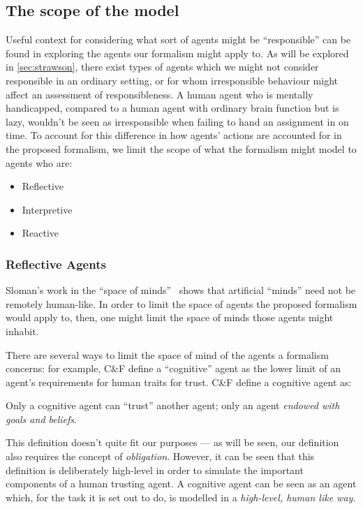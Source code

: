 \subsection{The scope of the model}\label{subsec:types-of-agents}
Useful context for considering what sort of agents might be ``responsible'' can be found in exploring the agents our formalism might apply to. As will be explored in \cref{sec:strawson}, there exist types of agents which we might not consider responsible in an ordinary setting, or for whom irresponsible behaviour might affect an assessment of responsibleness. A human agent who is mentally handicapped, compared to a human agent with ordinary brain function but is lazy, wouldn't be seen as irresponsible when failing to hand an assignment in on time. To account for this difference in how agents' actions are accounted for in the proposed formalism, we limit the scope of what the formalism might model to agents who are:\\
\begin{itemize}
    \item Reflective
    \item Interpretive
    \item Reactive
\end{itemize}

\subsubsection{Reflective Agents}
Sloman's work in the ``space of minds''~\cite{Sloman1984TheMinds} shows that artificial ``minds'' need not be remotely human-like. In order to limit the space of agents the proposed formalism would apply to, then, one might limit the space of minds those agents might inhabit.\par

There are several ways to limit the space of mind of the agents a formalism concerns: for example, C\&F define a ``cognitive'' agent as the lower limit of an agent's requirements for human traits for trust. C\&F define a cognitive agent as:
\begin{displayquote}
    Only a cognitive agent can ``trust'' another agent; only an agent \emph{endowed with goals and beliefs}.
\end{displayquote}\par

This definition doesn't quite fit our purposes --- as will be seen, our definition also requires the concept of \emph{obligation}. However, it can be seen that this definition is deliberately high-level in order to simulate the important components of a human trusting agent. A cognitive agent can be seen as an agent which, for the task it is set out to do, is modelled in a \emph{high-level, human like way}. \par

